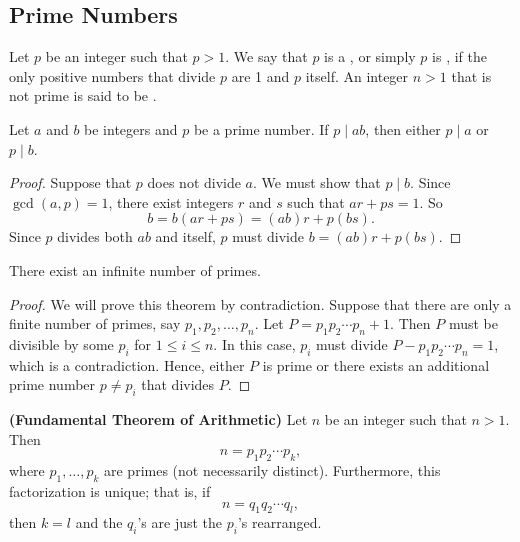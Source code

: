  
\subsection*{Prime Numbers}

Let $p$ be an integer such that $p > 1$.  We say that $p$ is a , or simply $p$ is , if the only positive numbers that divide $p$ are 1 and $p$ itself.  An integer $n > 1$ that is not prime is said to be .  

\begin{lemma}[Euclid]\label{integers:prime_divisor_theorem}
Let $a$ and $b$ be integers and $p$ be a prime number.  If $p \mid ab$, then either $p \mid a$ or $p \mid b$. 
\end{lemma}

\begin{proof}
Suppose that $p$ does not divide $a$.  We must show that $p \mid b$. Since $\gcd( a, p ) = 1$, there exist integers $r$ and $s$ such that $ar + ps = 1$.  So 
\[
b = b(ar + ps) = (ab)r + p(bs).
\]
Since $p$ divides both $ab$ and itself, $p$ must divide $b = (ab)r + p(bs)$. 
\end{proof}

\begin{theorem}[Euclid]\label{integers_inifinite_primes}
There exist an infinite number of primes.
\end{theorem}

\begin{proof}
We will prove this theorem by contradiction.  Suppose that there are only a finite number of primes, say $p_1, p_2, \ldots, p_n$.  Let $P = p_1  p_2  \cdots  p_n + 1$.    Then $P$ must be divisible by some $p_i$ for $1 \leq i \leq n$. In this  case, $p_i$ must divide $P - p_1 p_2 \cdots p_n = 1$, which is a contradiction.  Hence, either $P$ is prime or there exists an additional prime number $p \neq p_i$ that divides $P$.
\end{proof}

\begin{theorem} \textbf{(Fundamental Theorem of Arithmetic)} \label{integers_theorem_FTA}
Let $n$ be an integer such that $n > 1$.  Then
\[
n = p_1 p_2 \cdots p_k,
\]
where $p_1, \ldots, p_k$ are  primes (not necessarily distinct).  Furthermore, this factorization is unique; that is, if 
\[
n = q_1 q_2 \cdots q_l,
\]
then $k = l$ and the $q_i$'s are just the $p_i$'s rearranged.
\end{theorem}

